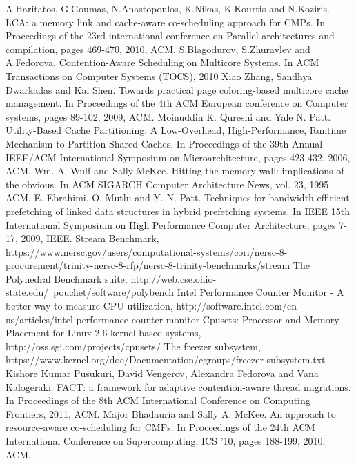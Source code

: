 \documentclass[diploma]{Styles/softlab-thesis}
\begin{document}
\begin{thebibliography}{99}
 A.Haritatos, G.Goumas, N.Anastopoulos, K.Nikas, K.Kourtis and N.Koziris. LCA: a memory link and cache-aware co-scheduling approach for CMPs. In Proceedings of the 23rd international conference on Parallel architectures and compilation, pages 469-470, 2010, ACM.
 S.Blagodurov, S.Zhuravlev and A.Fedorova. Contention-Aware Scheduling on Multicore Systems. In ACM Transactions on Computer Systems (TOCS), 2010
 Xiao Zhang, Sandhya Dwarkadas and Kai Shen. Towards practical page coloring-based multicore cache management. In Proceedings of the 4th ACM European conference on Computer systems, pages 89-102, 2009, ACM.
 Moinuddin K. Qureshi and Yale N. Patt. Utility-Based Cache Partitioning: A Low-Overhead, High-Performance, Runtime Mechanism to Partition Shared Caches. In Proceedings of the 39th Annual IEEE/ACM International Symposium on Microarchitecture, pages 423-432, 2006, ACM.
 Wm. A. Wulf and Sally McKee. Hitting the memory wall: implications of the obvious. In ACM SIGARCH Computer Architecture News, vol. 23, 1995, ACM.
 E. Ebrahimi, O. Mutlu and Y. N. Patt. Techniques for bandwidth-efficient prefetching of linked data structures in hybrid prefetching systems. In IEEE 15th International Symposium on High Performance Computer Architecture, pages 7-17, 2009, IEEE.
 Stream Benchmark, https://www.nersc.gov/users/computational-systems/cori/nersc-8-procurement/trinity-nersc-8-rfp/nersc-8-trinity-benchmarks/stream
 The Polyhedral Benchmark suite, http://web.cse.ohio-state.edu/~pouchet/software/polybench
 Intel Performance Counter Monitor - A better way to measure CPU utilization, http://software.intel.com/en-us/articles/intel-performance-counter-monitor
 Cpusets: Processor and Memory Placement for Linux 2.6 kernel based systems, http://oss.sgi.com/projects/cpusets/
 The freezer subsystem, https://www.kernel.org/doc/Documentation/cgroups/freezer-subsystem.txt
 Kishore Kumar Pusukuri, David Vengerov, Alexandra Fedorova and Vana Kalogeraki. FACT: a framework for adaptive contention-aware thread migrations. In Proceedings of the 8th ACM International Conference on Computing Frontiers, 2011, ACM.
 Major Bhadauria and Sally A. McKee. An approach to resource-aware co-scheduling for CMPs. In Proceedings of the 24th ACM International Conference on Supercomputing, ICS '10, pages 188-199, 2010, ACM.

\end{thebibliography}
\end{document}
